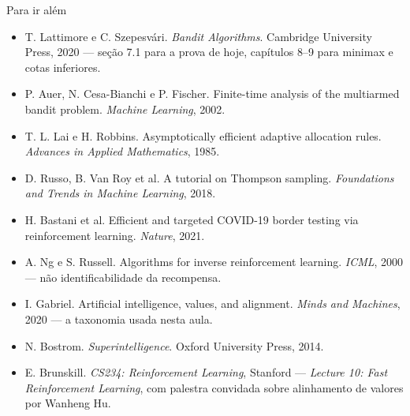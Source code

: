 \documentclass[aspectratio=169, 11pt]{beamer}
\begin{document}
\begin{frame}{Para ir além}
  {\scriptsize
  \begin{itemize}\setlength{\itemsep}{0.25ex}
    \item T. Lattimore e C. Szepesvári. \emph{Bandit Algorithms}. Cambridge
          University Press, 2020 --- seção 7.1 para a prova de hoje,
          capítulos 8--9 para minimax e cotas inferiores.
    \item P. Auer, N. Cesa-Bianchi e P. Fischer. Finite-time analysis of the
          multiarmed bandit problem. \emph{Machine Learning}, 2002.
    \item T. L. Lai e H. Robbins. Asymptotically efficient adaptive allocation
          rules. \emph{Advances in Applied Mathematics}, 1985.
    \item D. Russo, B. Van Roy et al. A tutorial on Thompson sampling.
          \emph{Foundations and Trends in Machine Learning}, 2018.
    \item H. Bastani et al. Efficient and targeted COVID-19 border testing via
          reinforcement learning. \emph{Nature}, 2021.
    \item A. Ng e S. Russell. Algorithms for inverse reinforcement learning.
          \emph{ICML}, 2000 --- não identificabilidade da recompensa.
    \item I. Gabriel. Artificial intelligence, values, and alignment.
          \emph{Minds and Machines}, 2020 --- a taxonomia usada nesta aula.
    \item N. Bostrom. \emph{Superintelligence}. Oxford University Press, 2014.
    \item E. Brunskill. \emph{CS234: Reinforcement Learning}, Stanford ---
          \emph{Lecture 10: Fast Reinforcement Learning}, com palestra
          convidada sobre alinhamento de valores por Wanheng Hu.
  \end{itemize}}
\end{frame}
\end{document}
